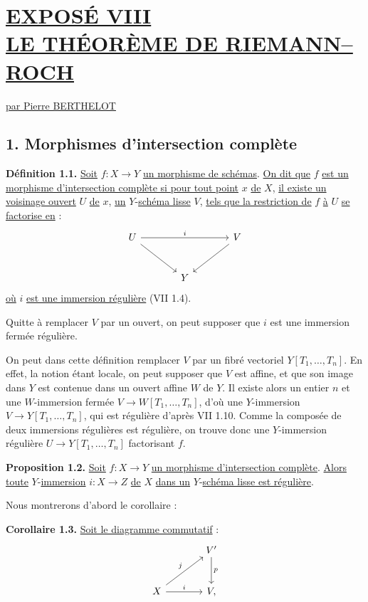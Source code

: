 
\section*{\underline{EXPOSÉ VIII}\\[3pt] \underline{\underline{LE THÉORÈME DE RIEMANN--ROCH}}}
\begin{center}
\underline{par Pierre BERTHELOT}
\end{center}

\subsection*{1. Morphismes d'intersection complète}

\textbf{Définition 1.1.} \uline{Soit} $f:X\to Y$ \uline{un morphisme de schémas}. \uline{On dit que} $f$ \uline{est un morphisme d'intersection complète si pour tout point} $x$ \uline{de} $X$, \uline{il existe un voisinage ouvert} $U$ \uline{de} $x$, \uline{un} $Y$-\uline{schéma lisse} $V$, \uline{tels que la restriction de} $f$ \uline{à} $U$ \uline{se factorise en} :
\[
\begin{tikzcd}[column sep=large,row sep=large]
U \arrow[rr,"i"] \arrow[dr] && V \arrow[dl]\\
& Y &
\end{tikzcd}
\]
\uline{où} $i$ \uline{est une immersion régulière} (VII 1.4).

Quitte à remplacer $V$ par un ouvert, on peut supposer que $i$ est une immersion fermée régulière.

On peut dans cette définition remplacer $V$ par un fibré vectoriel $Y[T_1,\ldots,T_n]$. En effet, la notion étant locale, on peut supposer que $V$ est affine, et que son image dans $Y$ est contenue dans un ouvert affine $W$ de $Y$. Il existe alors un entier $n$ et une $W$-immersion fermée $V\longrightarrow W[T_1,\ldots,T_n]$, d'où une $Y$-immersion $V\to Y[T_1,\ldots,T_n]$, qui est régulière d'après VII 1.10. Comme la composée de deux immersions régulières est régulière, on trouve donc une $Y$-immersion régulière $U\longrightarrow Y[T_1,\ldots,T_n]$ factorisant $f$.

\textbf{Proposition 1.2.} \uline{Soit} $f:X\to Y$ \uline{un morphisme d'intersection complète}. \uline{Alors toute} $Y$-\uline{immersion} $i:X\to Z$ \uline{de} $X$ \uline{dans un} $Y$-\uline{schéma lisse est régulière}.

Nous montrerons d'abord le corollaire :

\textbf{Corollaire 1.3.} \uline{Soit le diagramme commutatif} :
\[
\begin{tikzcd}[column sep=large,row sep=large]
& V' \arrow[d,"p"]\\
X \arrow[ur,"j"] \arrow[r,"i"] & V ,
\end{tikzcd}
\]
